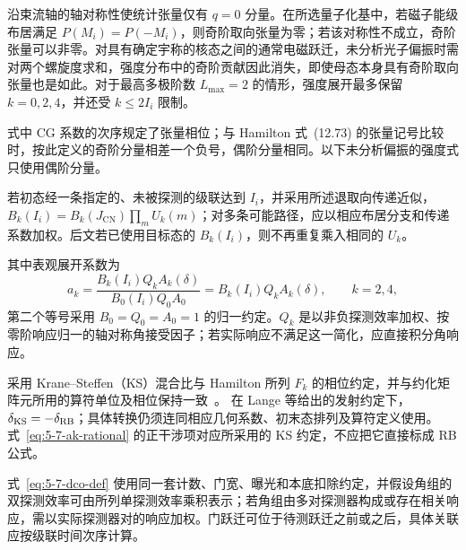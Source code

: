 
沿束流轴的轴对称性使统计张量仅有 $q=0$ 分量。在所选量子化基中，若磁子能级布居满足 $P(M_i)=P(-M_i)$，则奇阶取向张量为零；若该对称性不成立，奇阶张量可以非零。对具有确定宇称的核态之间的通常电磁跃迁，未分析光子偏振时需对两个螺旋度求和，强度分布中的奇阶贡献因此消失，即使母态本身具有奇阶取向张量也是如此。对于最高多极阶数 $L_{\max}=2$ 的情形，强度展开最多保留 $k=0,2,4$，并还受 $k\leq 2I_i$ 限制。

式中 CG 系数的次序规定了张量相位；与 Hamilton 式~(12.73) 的张量记号比较时，按此定义的奇阶分量相差一个负号，偶阶分量相同。以下未分析偏振的强度式只使用偶阶分量。

若初态经一条指定的、未被探测的级联达到 $I_i$，并采用所述退取向传递近似，$B_k(I_i)=B_k(J_{\mathrm{CN}})\prod_m U_k(m)$；对多条可能路径，应以相应布居分支和传递系数加权。后文若已使用目标态的 $B_k(I_i)$，则不再重复乘入相同的 $U_k$。

其中表观展开系数为
\[
a_k=\frac{B_k(I_i)Q_k A_k(\delta)}{B_0(I_i)Q_0 A_0}
    =B_k(I_i)Q_k A_k(\delta),\qquad k=2,4,
\]
第二个等号采用 $B_0=Q_0=A_0=1$ 的归一约定。$Q_k$ 是以非负探测效率加权、按零阶响应归一的轴对称角接受因子；若实际响应不满足这一简化，应直接积分角响应。

采用 Krane--Steffen（KS）混合比与 Hamilton 所列 $F_k$ 的相位约定，并与约化矩阵元所用的算符单位及相位保持一致~\cite{lange-kumar-hamilton-1982-multipole-admixtures,book-hamilton-electromagnetic-interaction}。
在 Lange 等给出的发射约定下，$\delta_{\rm KS}=-\delta_{\rm RB}$；具体转换仍须连同相应几何系数、初末态排列及算符定义使用。式~\eqref{eq:5-7-ak-rational} 的正干涉项对应所采用的 KS 约定，不应把它直接标成 RB 公式。

式~\eqref{eq:5-7-dco-def} 使用同一套计数、门宽、曝光和本底扣除约定，并假设角组的双探测效率可由所列单探测效率乘积表示；若角组由多对探测器构成或存在相关响应，需以实际探测器对的响应加权。门跃迁可位于待测跃迁之前或之后，具体关联应按级联时间次序计算。

